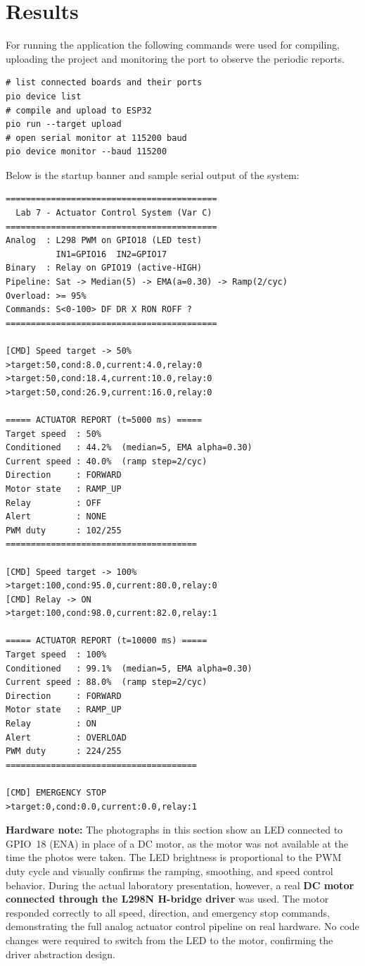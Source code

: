 \section{Results}

For running the application the following commands were used for compiling,
uploading the project and monitoring the port to observe the periodic reports.

\begin{verbatim}
# list connected boards and their ports
pio device list
# compile and upload to ESP32
pio run --target upload
# open serial monitor at 115200 baud
pio device monitor --baud 115200
\end{verbatim}

Below is the startup banner and sample serial output of the system:

\begin{verbatim}
==========================================
  Lab 7 - Actuator Control System (Var C)
==========================================
Analog  : L298 PWM on GPIO18 (LED test)
          IN1=GPIO16  IN2=GPIO17
Binary  : Relay on GPIO19 (active-HIGH)
Pipeline: Sat -> Median(5) -> EMA(a=0.30) -> Ramp(2/cyc)
Overload: >= 95%
Commands: S<0-100> DF DR X RON ROFF ?
==========================================

[CMD] Speed target -> 50%
>target:50,cond:8.0,current:4.0,relay:0
>target:50,cond:18.4,current:10.0,relay:0
>target:50,cond:26.9,current:16.0,relay:0

===== ACTUATOR REPORT (t=5000 ms) =====
Target speed  : 50%
Conditioned   : 44.2%  (median=5, EMA alpha=0.30)
Current speed : 40.0%  (ramp step=2/cyc)
Direction     : FORWARD
Motor state   : RAMP_UP
Relay         : OFF
Alert         : NONE
PWM duty      : 102/255
======================================

[CMD] Speed target -> 100%
>target:100,cond:95.0,current:80.0,relay:0
[CMD] Relay -> ON
>target:100,cond:98.0,current:82.0,relay:1

===== ACTUATOR REPORT (t=10000 ms) =====
Target speed  : 100%
Conditioned   : 99.1%  (median=5, EMA alpha=0.30)
Current speed : 88.0%  (ramp step=2/cyc)
Direction     : FORWARD
Motor state   : RAMP_UP
Relay         : ON
Alert         : OVERLOAD
PWM duty      : 224/255
======================================

[CMD] EMERGENCY STOP
>target:0,cond:0.0,current:0.0,relay:1
\end{verbatim}

\textbf{Hardware note:} The photographs in this section show an LED connected to
GPIO~18 (ENA) in place of a DC motor, as the motor was not available at the time the
photos were taken. The LED brightness is proportional to the PWM duty cycle and
visually confirms the ramping, smoothing, and speed control behavior. During the
actual laboratory presentation, however, a real \textbf{DC motor connected through
the L298N H-bridge driver} was used. The motor responded correctly to all speed,
direction, and emergency stop commands, demonstrating the full analog actuator
control pipeline on real hardware. No code changes were required to switch from the
LED to the motor, confirming the driver abstraction design.

